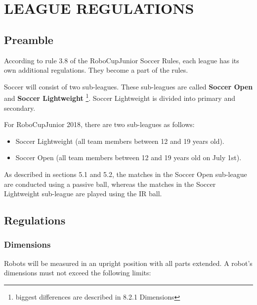 \documentclass{article}
\begin{document}
\section{LEAGUE REGULATIONS \label{ref-052}}

\subsection{ Preamble \label{ref-053}}

According to rule 3.8 of the RoboCupJunior Soccer Rules, each league has its
own additional regulations. They become a part of the rules.

Soccer will consist of two sub-leagues. These sub-leagues are called
\textbf{Soccer Open} and \textbf{Soccer Lightweight} \footnote{biggest
    differences are described in 8.2.1 Dimensions}. Soccer Lightweight is
divided into primary and secondary.

For RoboCupJunior 2018, there are two sub-leagues as follows:

\begin{itemize}

\item Soccer Lightweight (all team members between 12 and 19 years old).

\item Soccer Open (all team members between 12 and 19 years old on July 1st).

\end{itemize}

As described in sections 5.1 and 5.2, the matches in the Soccer Open sub-league
are conducted using a passive ball, whereas the matches in the Soccer
Lightweight sub-league are played using the IR ball.

\subsection{Regulations \label{ref-054}}

\subsubsection{Dimensions \label{ref-055}}

Robots will be measured in an upright position with all parts extended. A
robot's dimensions must not exceed the following limits:
\end{document}
